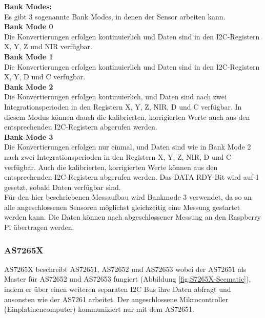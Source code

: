 \noindent \textbf{Bank Modes:}\\
\label{sec_bank_modes}
Es gibt 3 sogenannte Bank Modes, in denen der Sensor arbeiten kann.\\
\textbf{Bank Mode 0}\\
Die Konvertierungen erfolgen kontinuierlich und Daten sind in den I2C-Registern X, Y, Z und NIR verfügbar.\\
\textbf{Bank Mode 1}\\
Die Konvertierungen erfolgen kontinuierlich und Daten sind in den I2C-Registern X, Y, D und C verfügbar.\\
\textbf{Bank Mode 2}\\
Die Konvertierungen erfolgen kontinuierlich, und Daten sind nach zwei Integrationsperioden in den Registern X, Y, Z, NIR, D und C verfügbar. 
In diesem Modus können dauch die kalibrierten, korrigierten Werte auch aus den entsprechenden I2C-Registern abgerufen werden.\\
\textbf{Bank Mode 3}\\
Die Konvertierungen erfolgen nur einmal, und Daten sind wie in Bank Mode 2 nach zwei Integrationsperioden in den Registern X, Y, Z, NIR, D und C verfügbar.
Auch die kalibrierten, korrigierten Werte können aus den entsprechenden I2C-Registern abgerufen werden.
Das DATA RDY-Bit wird auf 1 gesetzt, sobald Daten verfügbar sind.\\
Für den hier beschriebenen Messaufbau wird Bankmode 3 verwendet, da so an alle angeschlossenen Sensoren möglichst gleichzeitig eine Messung gestartet werden kann.
Die Daten können nach abgeschlossener Messung an den Raspberry Pi übertragen werden.

\subsubsection{AS7265X}\label{AS7265X}
AS7265X beschreibt AS72651, AS72652 und AS72653 wobei der AS72651 als Master für AS72652 und AS72653 fungiert (Abbildung \ref{fig:S7265X-Scematic}), indem er über einen weiteren separaten I2C Bus ihre Daten abfragt und ansonsten wie der AS7261 arbeitet.
Der angeschlossene Mikrocontroller (Einplatinencomputer) kommuniziert nur mit dem AS72651.

